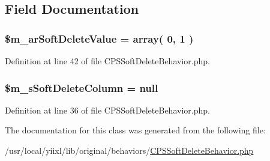 \subsection{Field Documentation}
\hypertarget{classCPSSoftDeleteBehavior_afffc6767951dd7ae09c5571eaf276a47}{
\subsubsection[{\$m\_\-arSoftDeleteValue}]{\setlength{\rightskip}{0pt plus 5cm}\$m\_\-arSoftDeleteValue = {\bf array}( 0, 1 )}}
\label{classCPSSoftDeleteBehavior_afffc6767951dd7ae09c5571eaf276a47}


Definition at line 42 of file CPSSoftDeleteBehavior.php.

\hypertarget{classCPSSoftDeleteBehavior_a437e6cd4c0206616755f3d8ccbe23dcd}{
\subsubsection[{\$m\_\-sSoftDeleteColumn}]{\setlength{\rightskip}{0pt plus 5cm}\$m\_\-sSoftDeleteColumn = null}}
\label{classCPSSoftDeleteBehavior_a437e6cd4c0206616755f3d8ccbe23dcd}


Definition at line 36 of file CPSSoftDeleteBehavior.php.



The documentation for this class was generated from the following file:\begin{DoxyCompactItemize}
\item 
/usr/local/yiixl/lib/original/behaviors/\hyperlink{CPSSoftDeleteBehavior_8php}{CPSSoftDeleteBehavior.php}\end{DoxyCompactItemize}
